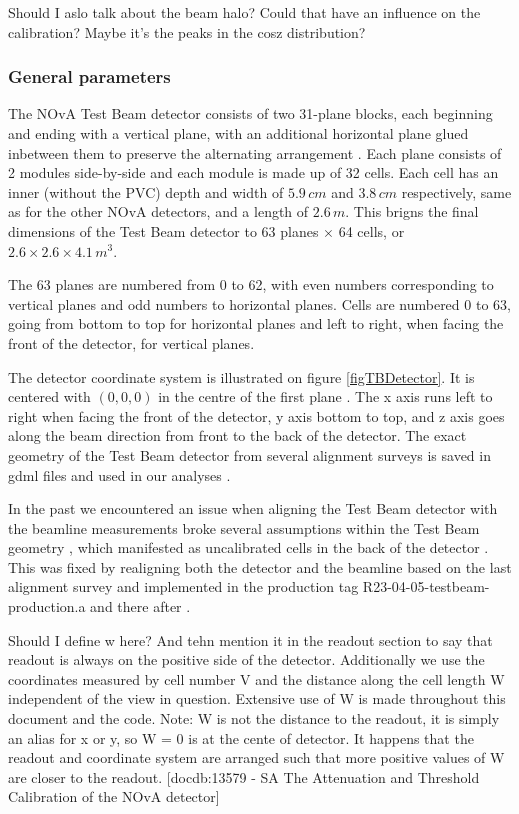 \documentclass[12pt,a4paper]{article}
\begin{document}
Should I aslo talk about the beam halo? Could that have an influence on the calibration? Maybe it's the peaks in the cosz distribution?

\subsubsection*{General parameters}
The NOvA Test Beam detector consists of two 31-plane blocks, each beginning and ending with a vertical plane, with an additional horizontal plane glued inbetween them to preserve the alternating arrangement \cite{NOVA-doc-29543}. Each plane consists of 2 modules side-by-side and each module is made up of 32 cells. Each cell has an inner (without the PVC) depth and width of $5.9\,\unit{cm}$ and $3.8\,\unit{cm}$ respectively, same as for the other NOvA detectors, and a length of $2.6\,\unit{m}$. This brigns the final dimensions of the Test Beam detector to 63 planes $\times$ 64 cells, or $2.6\times 2.6\times 4.1\,\unit{m^3}$.

The 63 planes are numbered from 0 to 62, with even numbers corresponding to vertical planes and odd numbers to horizontal planes. Cells are numbered 0 to 63, going from bottom to top for horizontal planes and left to right, when facing the front of the detector, for vertical planes.

The detector coordinate system is illustrated on figure \ref{figTBDetector}. It is centered with $\left(0,0,0\right)$ in the centre of the first plane \cite{NOVA-doc-58388}. The x axis runs left to right when facing the front of the detector, y axis bottom to top, and z axis goes along the beam direction from front to the back of the detector. The exact geometry of the Test Beam detector from several alignment surveys is saved in gdml files and used in our analyses \cite{NOVA-doc-57955}.

In the past we encountered an issue when aligning the Test Beam detector with the beamline measurements broke several assumptions within the Test Beam geometry \cite{NOVA-doc-58388}, which manifested as uncalibrated cells in the back of the detector \cite{NOVA-doc-57516-v2}. This was fixed by realigning both the detector and the beamline based on the last alignment survey and implemented in the production tag R23-04-05-testbeam-production.a and there after \cite{NOVA-doc-58388}.

Should I define w here? And tehn mention it in the readout section to say that readout is always on the positive side of the detector.
Additionally we use the coordinates measured by cell number V and the distance along the cell length W independent of the view in question. Extensive use of W is made throughout this document and the code. Note: W is not the distance to the readout, it is simply an alias for x or y, so W = 0 is at the cente of detector. It happens that the readout and coordinate system are arranged such that more positive values of W are closer to the readout. [docdb:13579 - SA The Attenuation and Threshold Calibration of the NOvA detector]
\end{document}
